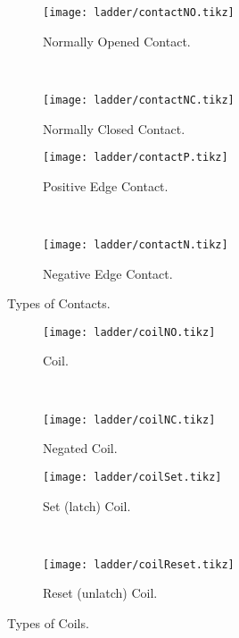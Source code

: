 \begin{figure}[H]
\begin{subfigure}[t]{0.45\textwidth}
  \centering \texttt{[image: ladder/contactNO.tikz]}
  \caption{Normally Opened Contact.}
  \label{fig:contactNO}
\end{subfigure}
~
\begin{subfigure}[t]{0.45\textwidth}
  \centering \texttt{[image: ladder/contactNC.tikz]}
  \caption{Normally Closed Contact.}
  \label{fig:contactNC}
\end{subfigure}
\vspace{1em}

\begin{subfigure}[t]{0.45\textwidth}
  \centering \texttt{[image: ladder/contactP.tikz]}
  \caption{Positive Edge Contact.}
  \label{fig:contactP}
\end{subfigure}
~
\begin{subfigure}[t]{0.45\textwidth}
  \centering \texttt{[image: ladder/contactN.tikz]}
  \caption{Negative Edge Contact.}
  \label{fig:contactN}
\end{subfigure}

  \caption{Types of Contacts.}
  \label{fig:contacts}
\end{figure}

\begin{figure}[H]
\begin{subfigure}[t]{0.45\textwidth}
  \centering \texttt{[image: ladder/coilNO.tikz]}
  \caption{Coil.}
  \label{fig:contactNO}
\end{subfigure}
~
\begin{subfigure}[t]{0.45\textwidth}
  \centering \texttt{[image: ladder/coilNC.tikz]}
  \caption{Negated Coil.}
  \label{fig:contactNC}
\end{subfigure}
\vspace{1em}

\begin{subfigure}[t]{0.45\textwidth}
  \centering \texttt{[image: ladder/coilSet.tikz]}
  \caption{Set (latch) Coil.}
  \label{fig:contactP}
\end{subfigure}
~
\begin{subfigure}[t]{0.45\textwidth}
  \centering \texttt{[image: ladder/coilReset.tikz]}
  \caption{Reset (unlatch) Coil.}
  \label{fig:contactN}
\end{subfigure}

  \caption{Types of Coils.}
  \label{fig:coils}
\end{figure}

